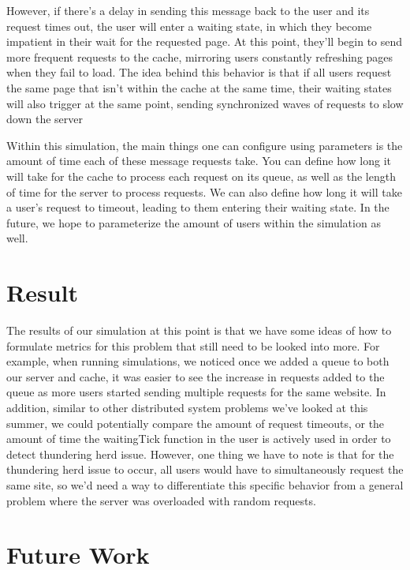 \documentclass{article}
\begin{document}
However, if there's a delay in sending this message back to the user and its request times out, the user will enter a waiting state, in which they become impatient in their wait for the requested page.  At this point, they'll begin to send more frequent requests to the cache, mirroring users constantly refreshing pages when they fail to load.  The idea behind this behavior is that if all users request the same page that isn't within the cache at the same time, their waiting states will also trigger at the same point, sending synchronized waves of requests to slow down the server \newline

Within this simulation, the main things one can configure using parameters is the amount of time each of these message requests take.  You can define how long it will take for the cache to process each request on its queue, as well as the length of time for the server to process requests.  We can also define how long it will take a user's request to timeout, leading to them entering their waiting state.  In the future, we hope to parameterize the amount of users within the simulation as well. \newline

\section{Result} %

The results of our simulation at this point is that we have some ideas of how to formulate metrics for this problem that still need to be looked into more.  For example, when running simulations, we noticed once we added a queue to both our server and cache, it was easier to see the increase in requests added to the queue as more users started sending multiple requests for the same website.  In addition, similar to other distributed system problems we've looked at this summer, we could potentially compare the amount of request timeouts, or the amount of time the waitingTick function in the user is actively used in order to detect thundering herd issue.  However, one thing we have to note is that for the thundering herd issue to occur, all users would have to simultaneously request the same site, so we'd need a way to differentiate this specific behavior from a general problem where the server was overloaded with random requests.

\section{Future Work} %
\end{document}
